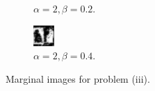 \documentclass{article}
\begin{document}
\begin{figure}[t]
\begin{subfigure}[t]{0.25\textwidth}
  \vspace{-0.6cm}
  \caption{$\alpha=2, \beta=0.2$.}
  \label{f:iii-2}
\end{subfigure}
\begin{subfigure}[t]{0.25\textwidth}
  \centering
  \includegraphics[width=\textwidth]{iii_alpha_2_beta_0.4.bmp}
  \vspace{-0.6cm}
  \caption{$\alpha=2, \beta=0.4$.}
  \label{f:iii-3}
\end{subfigure}
\vspace{-0.3cm}
\caption{Marginal images for problem (iii).}
\label{f:denoise_iii}
\end{figure}
\end{document}
